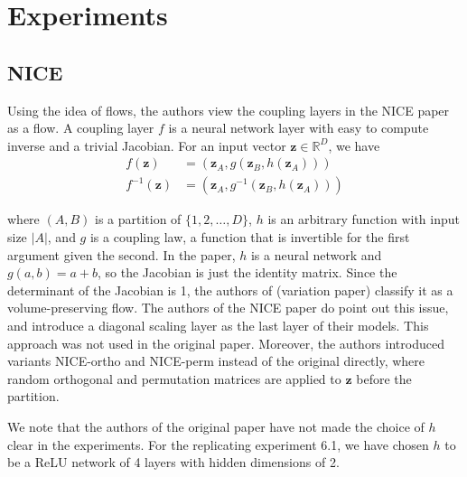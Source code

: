 \chapter{Experiments}

\section*{NICE}

Using the idea of flows, the authors view the coupling layers in the NICE paper as a flow. A coupling layer $f$ is a neural network layer with easy to compute inverse and a trivial Jacobian. For an input vector $\mathbf{z} \in \mathbb{R}^D$, we have
\begin{align*}
    f(\mathbf{z}) &= (\mathbf{z}_A, g(\mathbf{z}_B,h(\mathbf{z}_A)))\\
    f^{-1}(\mathbf{z}) &= (\mathbf{z}_A, g^{-1}(\mathbf{z}_B,h(\mathbf{z}_A)))
\end{align*}

where $(A,B)$ is a partition of $\{1,2,\dots,D\}$, $h$ is an arbitrary function with input size $|A|$, and $g$ is a coupling law, a function that is invertible for the first argument given the second. In the paper, $h$ is a neural network and $g(a,b)=a+b$, so the Jacobian is just the identity matrix. Since the determinant of the Jacobian is 1, the authors of (variation paper) classify it as a volume-preserving flow.
The authors of the NICE paper do point out this issue, and introduce a diagonal scaling layer as the last layer of their models. This approach was not used in the original paper. Moreover, the authors introduced variants NICE-ortho and NICE-perm instead of the original directly, where random orthogonal and permutation matrices are applied to $\mathbf{z}$ before the partition. 

We note that the authors of the original paper have not made the choice of $h$ clear in the experiments. For the replicating experiment 6.1, we have chosen $h$ to be a ReLU network of 4 layers with hidden dimensions of 2.
